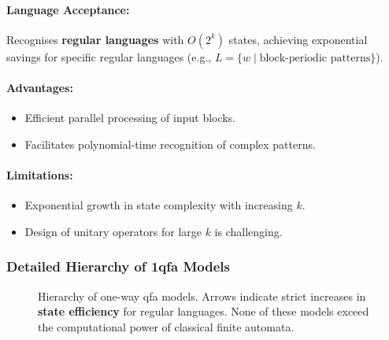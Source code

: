 \paragraph{Language Acceptance:}  
Recognises \textbf{regular languages} with \( O(2^k) \) states, achieving exponential savings for specific regular languages (e.g., \( L = \{w \mid \text{block-periodic patterns}\} \)).
\paragraph{Advantages:}
\begin{itemize}
    \item Efficient parallel processing of input blocks.
    \item Facilitates polynomial-time recognition of complex patterns.
\end{itemize}

\paragraph{Limitations:}
\begin{itemize}
    \item Exponential growth in state complexity with increasing \( k \).
    \item Design of unitary operators for large \( k \) is challenging.
\end{itemize}

\subsubsection*{Detailed Hierarchy of \gls{1qfa} Models}
\label{subsec:hierarchy-diagram}

\begin{figure}[ht]
    \centering
    \caption{Hierarchy of one-way \gls{qfa} models. Arrows indicate strict increases in \textbf{state efficiency} for regular languages. None of these models exceed the computational power of classical finite automata.}
    \label{fig:qfa-hierarchy}
\end{figure}

